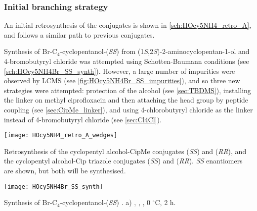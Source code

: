 \subsubsection{Initial branching strategy}

An initial retrosynthesis of the conjugates is shown in \ref{sch:HOcy5NH4_retro_A}, and follows a similar path to previous conjugates.

Synthesis of Br-C$_4$-cyclopentanol-(\textit{SS})  from (1\textit{S},2\textit{S})-2-aminocyclopentan-1-ol  and 4-bromobutyryl chloride  was attempted using Schotten-Baumann conditions (see \ref{sch:HOcy5NH4Br_SS_synth}). However, a large number of impurities were observed by LCMS (see \ref{fig:HOcy5NH4Br_SS_impurities}), and so three new strategies were attempted: protection of the alcohol (see \ref{sec:TBDMS}), installing the linker on methyl ciprofloxacin  and then attaching the head group by peptide coupling (see \ref{sec:CipMe_linker}), and using 4-chlorobutyryl chloride  as the linker instead of 4-bromobutyryl chloride  (see \ref{sec:Cl4Cl}).

\begin{scheme}[H]
	\begin{center}
		\texttt{[image: HOcy5NH4\_retro\_A\_wedges]}
		\caption{Retrosynthesis of the cyclopentyl alcohol-CipMe conjugates 
		 (\textit{SS}) and 
		 (\textit{RR}),
		and the cyclopentyl alcohol-Cip triazole conjugates 
		 (\textit{SS}) and   (\textit{RR}). 
		\textit{SS} enantiomers are shown, but both will be synthesised. \label{sch:HOcy5NH4_retro_A}}
	\end{center}
\end{scheme}




\begin{scheme}[H]
	\begin{center}
		\texttt{[image: HOcy5NH4Br\_SS\_synth]}
		\caption{Synthesis of Br-C$_4$-cyclopentanol-(\textit{SS}) .
		a) , , , 0 $^{\circ}$C, 2 h. \label{sch:HOcy5NH4Br_SS_synth}}
	\end{center}
\end{scheme}


